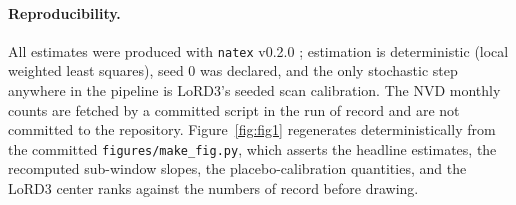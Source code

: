 \documentclass[11pt]{article}
\newcommand{\natex}{\texttt{natex}}
\begin{document}
\paragraph{Reproducibility.} All estimates were produced with \natex{}
v0.2.0 \cite{natex}; estimation is deterministic (local weighted least
squares), seed 0 was declared, and the only stochastic step anywhere in the
pipeline is LoRD3's seeded scan calibration. The NVD monthly counts are
fetched by a committed script in the run of record and are not committed to
the repository. Figure~\ref{fig:fig1} regenerates deterministically from the
committed \texttt{figures/make\_fig.py}, which asserts the headline
estimates, the recomputed sub-window slopes, the placebo-calibration
quantities, and the LoRD3 center ranks against the numbers of record before
drawing.
\end{document}
